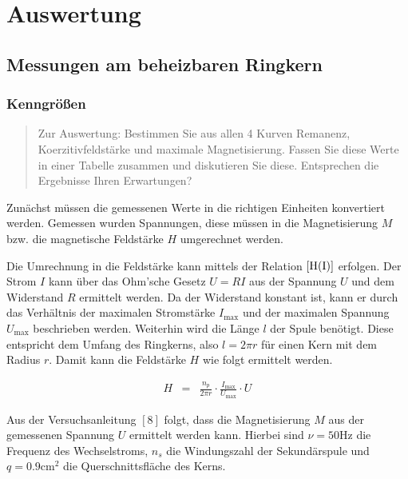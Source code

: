 \documentclass[12pt,a4paper]{scrartcl}
\numberwithin{equation}{section} %
\newcommand{\pu}[1]{\ensuremath{\mathrm{#1}}}
\renewcommand{\[}{} %
\renewcommand{\]}{\noindent} %
\begin{document}
\hypertarget{auswertung}{%
\section{Auswertung}\label{auswertung}}

\hypertarget{messungen-am-beheizbaren-ringkern}{%
\subsection{Messungen am beheizbaren
Ringkern}\label{messungen-am-beheizbaren-ringkern}}

\hypertarget{kenngruxf6uxdfen}{%
\subsubsection{Kenngrößen}\label{kenngruxf6uxdfen}}

\begin{quote}
Zur Auswertung: Bestimmen Sie aus allen 4 Kurven Remanenz,
Koerzitivfeldstärke und maximale Magnetisierung. Fassen Sie diese Werte
in einer Tabelle zusammen und diskutieren Sie diese. Entsprechen die
Ergebnisse Ihren Erwartungen?
\end{quote}

Zunächst müssen die gemessenen Werte in die richtigen Einheiten
konvertiert werden. Gemessen wurden Spannungen, diese müssen in die
Magnetisierung \(M\) bzw. die magnetische Feldstärke \(H\) umgerechnet
werden.

Die Umrechnung in die Feldstärke kann mittels der Relation
\(\eqref{H(I)}\) erfolgen. Der Strom \(I\) kann über das Ohm'sche Gesetz
\(U=RI\) aus der Spannung \(U\) und dem Widerstand \(R\) ermittelt
werden. Da der Widerstand konstant ist, kann er durch das Verhältnis der
maximalen Stromstärke \(I_\mathrm{max}\) und der maximalen Spannung
\(U_\mathrm{max}\) beschrieben werden. Weiterhin wird die Länge \(l\)
der Spule benötigt. Diese entspricht dem Umfang des Ringkerns, also
\(l=2\pi r\) für einen Kern mit dem Radius \(r\). Damit kann die
Feldstärke \(H\) wie folgt ermittelt werden.

\[
\begin{eqnarray}
    H &=&
        \frac{n_p}{2\pi r} \cdot \frac{I_\mathrm{max}}{U_\mathrm{max}} \cdot U
        \label{H}
\end{eqnarray}
\]

Aus der Versuchsanleitung \([8]\) folgt, dass die Magnetisierung \(M\)
aus der gemessenen Spannung \(U\) ermittelt werden kann. Hierbei sind
\(\nu=\pu{50 Hz}\) die Frequenz des Wechselstroms, \(n_s\) die
Windungszahl der Sekundärspule und \(q = \pu{0.9 cm^2}\) die
Querschnittsfläche des Kerns.
\end{document}
